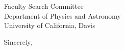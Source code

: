 \documentclass[12pt]{letter}
\begin{document}
\begin{letter}{
               Faculty Search Committee \\
               Department of Physics and Astronomy \\
               University of California, Davis 
           }
\closing{Sincerely,}
\vspace{-0.9in}
\\
\end{letter}
\end{document}
